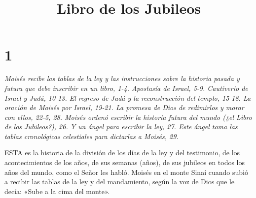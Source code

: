 

\title{Libro de los Jubileos}

\chapter{1}

\par \textit{Moisés recibe las tablas de la ley y las instrucciones sobre la historia pasada y futura que debe inscribir en un libro, 1-4. Apostasía de Israel, 5-9. Cautiverio de Israel y Judá, 10-13. El regreso de Judá y la reconstrucción del templo, 15-18. La oración de Moisés por Israel, 19-21. La promesa de Dios de redimirlos y morar con ellos, 22-5, 28. Moisés ordenó escribir la historia futura del mundo (¿el Libro de los Jubileos?), 26. Y un ángel para escribir la ley, 27. Este ángel toma las tablas cronológicas celestiales para dictarlas a Moisés, 29.}

\par ESTA es la historia de la división de los días de la ley y del testimonio, de los acontecimientos de los años, de sus semanas (años), de sus jubileos en todos los años del mundo, como el Señor les habló. Moisés en el monte Sinaí cuando subió a recibir las tablas de la ley y del mandamiento, según la voz de Dios que le decía: «Sube a la cima del monte».

